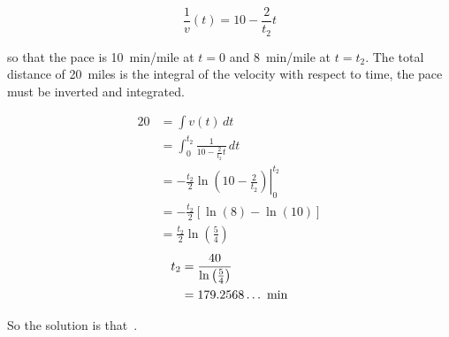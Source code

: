 \documentclass{article}
\begin{document}
\[
\frac{1}{v}(t)=10-\frac{2}{t_{2}}t
\]

so that the pace is 10~min/mile at $t=0$ and 8~min/mile at $t=t_{2}$.
The total distance of 20~miles is the integral of the velocity with respect to time, the pace must be inverted and integrated.

\begin{align*}
20 &= \int v(t)\,dt \\
   &= \int_{0}^{t_{2}}\frac{1}{10-\frac{2}{t_{2}}t}\,dt \\
   &= -\frac{t_{2}}{2}\left.\ln\left(10-\frac{2}{t_{2}}\right)\right|_{0}^{t_{2}} \\
   &= -\frac{t_{2}}{2}\left[\ln(8)-\ln(10)\right] \\
   &= \frac{t_{2}}{2}\ln\left(\frac{5}{4}\right)
\end{align*}
\begin{align*}
t_{2} &= \frac{40}{\ln\left(\frac{5}{4}\right)} \\
      &= 179.2568\dots~\rm{min}
\end{align*}

So the solution is that
\,.
\end{document}
